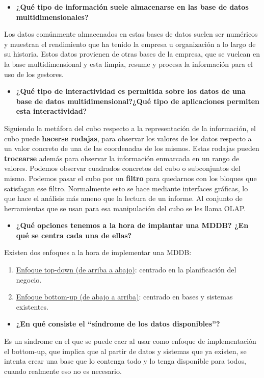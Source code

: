 \documentclass[paper=a4, fontsize=11pt]{scrartcl} %
\begin{document}
\begin{itemize}
\item \textbf{¿Qué tipo de información suele almacenarse en las base de datos multidimensionales?}
\end{itemize}
Los datos comúnmente almacenados en estas bases de datos suelen ser numéricos y muestran el rendimiento que ha tenido la empresa u organización a lo largo de su historia. Estos datos provienen de otras bases de la empresa, que se vuelcan en la base multidimensional y esta limpia, resume y procesa la información para el uso de los gestores.

\begin{itemize}
\item \textbf{ ¿Qué tipo de interactividad es permitida sobre los datos de una base de datos multidimensional?¿Qué tipo de aplicaciones permiten esta interactividad?}
\end{itemize}
Siguiendo la metáfora del cubo respecto a la representación de la información, el cubo puede \textbf{hacerse rodajas}, para observar los valores de los datos respecto a un valor concreto de una de las coordenadas de los mismos. Estas rodajas pueden \textbf{trocearse} además para observar la información enmarcada en un rango de valores. Podemos observar cuadrados concretos del cubo o subconjuntos del mismo. Podemos pasar el cubo por un \textbf{filtro} para quedarnos con los bloques que satisfagan ese filtro. Normalmente esto se hace mediante interfaces gráficas, lo que hace el análisis más ameno que la lectura de un informe. Al conjunto de herramientas que se usan para esa manipulación del cubo se les llama OLAP. 

\begin{itemize}
\item \textbf{¿Qué opciones tenemos a la hora de implantar una MDDB? ¿En qué se centra cada una de ellas?}
\end{itemize}
Existen dos enfoques a la hora de implementar una MDDB:
\begin{enumerate}
\item \underline{Enfoque top-down (de arriba a abajo)}: centrado en la planificación del negocio.
\item \underline{Enfoque bottom-up (de abajo a arriba)}: centrado en bases y sistemas existentes.
\end{enumerate}

\begin{itemize}
\item \textbf{ ¿En qué consiste el ``síndrome de los datos disponibles''?}
\end{itemize}
Es un síndrome en el que se puede caer al usar como enfoque de implementación el bottom-up, que implica que al partir de datos y sistemas que ya existen, se intenta crear una base que lo contenga todo y lo tenga disponible para todos, cuando realmente eso no es necesario.
\end{document}
